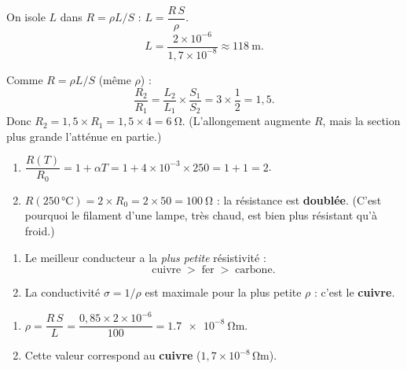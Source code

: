 \documentclass[11pt,a4paper]{article}
\begin{document}
\usetikzlibrary{babel}
\begin{corrige}
On isole $L$ dans $R=\rho L/S$ : $L=\dfrac{R\,S}{\rho}$.
\[ L=\frac{2\times10^{-6}}{1{,}7\times10^{-8}}\approx\qty{118}{\metre}. \]
\end{corrige}

\begin{corrige}
Comme $R=\rho L/S$ (même $\rho$) :
\[ \frac{R_2}{R_1}=\frac{L_2}{L_1}\times\frac{S_1}{S_2}=3\times\frac{1}{2}=1{,}5. \]
Donc $R_2=1{,}5\times R_1=1{,}5\times4=\qty{6}{\ohm}$. (L'allongement augmente $R$, mais la section
plus grande l'atténue en partie.)
\end{corrige}

\begin{corrige}
\begin{enumerate}[label=\alph*)]
  \item $\dfrac{R(T)}{R_0}=1+\alpha T=1+4\times10^{-3}\times250=1+1=2$.
  \item $R(250\,\si{\degreeCelsius})=2\times R_0=2\times50=\qty{100}{\ohm}$ : la résistance est
        \textbf{doublée}. (C'est pourquoi le filament d'une lampe, très chaud, est bien plus résistant
        qu'à froid.)
\end{enumerate}
\end{corrige}

\begin{corrige}
\begin{enumerate}[label=\alph*)]
  \item Le meilleur conducteur a la \emph{plus petite} résistivité :
        \[ \text{cuivre} \;>\; \text{fer} \;>\; \text{carbone}. \]
  \item La conductivité $\sigma=1/\rho$ est maximale pour la plus petite $\rho$ : c'est le
        \textbf{cuivre}.
\end{enumerate}
\end{corrige}

\begin{corrige}
\begin{enumerate}[label=\alph*)]
  \item $\rho=\dfrac{R\,S}{L}=\dfrac{0{,}85\times2\times10^{-6}}{100}=\qty{1.7e-8}{\ohm\metre}$.
  \item Cette valeur correspond au \textbf{cuivre} ($1{,}7\times10^{-8}\,\si{\ohm\metre}$).
\end{enumerate}
\end{corrige}
\end{document}
